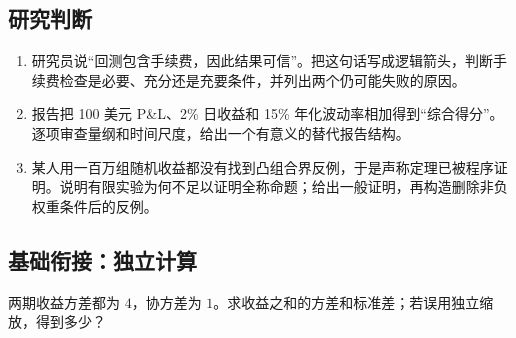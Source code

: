 \subsection*{研究判断}
\begin{enumerate}[nosep,leftmargin=*]
  \item 研究员说“回测包含手续费，因此结果可信”。把这句话写成逻辑箭头，判断手续费检查是必要、充分还是充要条件，并列出两个仍可能失败的原因。
  \item 报告把 100 美元 P\&L、2\% 日收益和 15\% 年化波动率相加得到“综合得分”。逐项审查量纲和时间尺度，给出一个有意义的替代报告结构。
  \item 某人用一百万组随机收益都没有找到凸组合界反例，于是声称定理已被程序证明。说明有限实验为何不足以证明全称命题；给出一般证明，再构造删除非负权重条件后的反例。
\end{enumerate}
\endgroup

\subsection*{基础衔接：独立计算}
两期收益方差都为 $4$，协方差为 $1$。求收益之和的方差和标准差；若误用独立缩放，得到多少？

